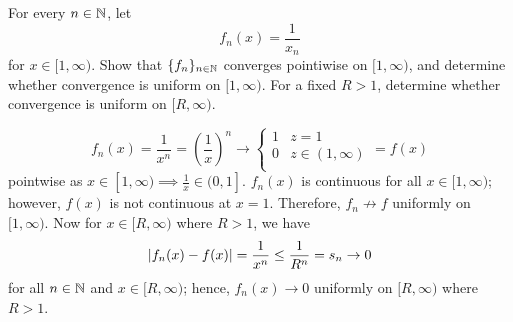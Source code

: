 
\setcounter{question}{0}
\question For every $n \in \mathbb{N}$, let 
\[f_n(x) = \frac1{x_n}\]
for $x \in [1, \infty)$.
Show that $\{f_n\}_{n \in \mathbb{N}}$ converges pointiwise on $[1, \infty)$, 
and determine whether convergence is uniform on $[1, \infty)$.
For a fixed $R > 1$, determine whether convergence is uniform on $[R, \infty)$.
\begin{solution}
    \[ f_n(x) = \frac 1{x^n} = \left(\frac1x\right)^n \to 
        \begin{cases}
            1 & z = 1 \\
            0 & z \in (1, \infty) \\
        \end{cases} 
    = f(x) \]
        pointwise as $x \in [1, \infty) \implies \frac1x \in (0, 1]$.
        $f_n(x)$ is continuous for all $x \in [1, \infty)$; 
        however, $f(x)$ is not continuous at $x = 1$. 
        Therefore, $f_n \not \to f$ uniformly on $[1, \infty)$.
        Now for $x \in [R, \infty)$ where $R > 1$, we have
        \[ \left\lvert f_n(x) - f(x)\right\rvert = \frac1{x^n} \leq \frac1{R^n} = s_n \to 0 \]
        for all $n \in \mathbb{N}$ and $x \in [R, \infty)$; hence, 
        $f_n(x) \to 0$ uniformly on $[R, \infty)$ where $R > 1$.
\end{solution}

\setcounter{question}{2}
\question
{}

